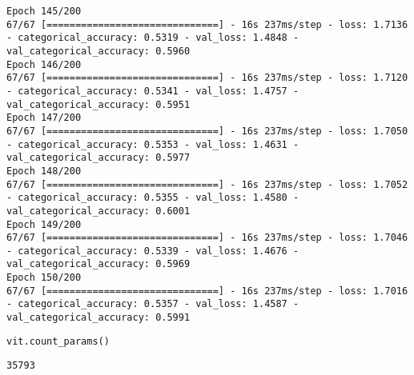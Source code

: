 \begin{lstlisting}
Epoch 145/200
67/67 [==============================] - 16s 237ms/step - loss: 1.7136 - categorical_accuracy: 0.5319 - val_loss: 1.4848 - val_categorical_accuracy: 0.5960
Epoch 146/200
67/67 [==============================] - 16s 237ms/step - loss: 1.7120 - categorical_accuracy: 0.5341 - val_loss: 1.4757 - val_categorical_accuracy: 0.5951
Epoch 147/200
67/67 [==============================] - 16s 237ms/step - loss: 1.7050 - categorical_accuracy: 0.5353 - val_loss: 1.4631 - val_categorical_accuracy: 0.5977
Epoch 148/200
67/67 [==============================] - 16s 237ms/step - loss: 1.7052 - categorical_accuracy: 0.5355 - val_loss: 1.4580 - val_categorical_accuracy: 0.6001
Epoch 149/200
67/67 [==============================] - 16s 237ms/step - loss: 1.7046 - categorical_accuracy: 0.5339 - val_loss: 1.4676 - val_categorical_accuracy: 0.5969
Epoch 150/200
67/67 [==============================] - 16s 237ms/step - loss: 1.7016 - categorical_accuracy: 0.5357 - val_loss: 1.4587 - val_categorical_accuracy: 0.5991
\end{lstlisting}

\begin{lstlisting}[language=Python]
vit.count_params()
\end{lstlisting}

\begin{lstlisting}
35793
\end{lstlisting}
